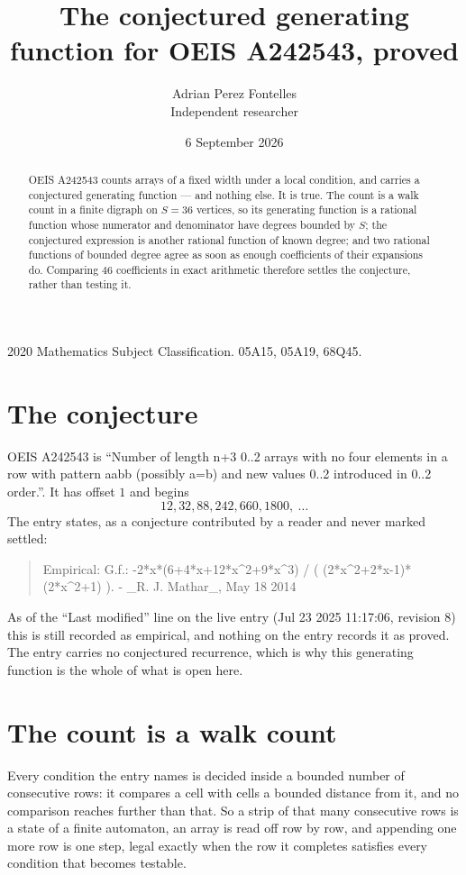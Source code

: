\documentclass[11pt,a4paper]{article}
\title{The conjectured generating function for OEIS A242543, proved}
\author{Adrian Perez Fontelles\\ \small Independent researcher}
\date{6 September 2026}
\theoremstyle{plain}
\theoremstyle{definition}
\begin{document}
\maketitle

\begin{abstract}
OEIS A242543 counts arrays of a fixed width under a local condition, and carries a conjectured
generating function --- and nothing else. It is true. The count is a walk count in a finite
digraph on $S=36$ vertices, so its generating function is a rational function whose numerator
and denominator have degrees bounded by $S$; the conjectured expression is another rational
function of known degree; and two rational functions of bounded degree agree as soon as enough
coefficients of their expansions do. Comparing $46$ coefficients in exact arithmetic
therefore settles the conjecture, rather than testing it.
\end{abstract}

\noindent\small 2020 Mathematics Subject Classification. 05A15, 05A19, 68Q45.\normalsize

\section{The conjecture}

OEIS A242543 is ``Number of length n+3 0..2 arrays with no four elements in a row with pattern aabb (possibly a=b) and new values 0..2 introduced in 0..2 order.''. It has offset $1$ and begins
\[
12, 32, 88, 242, 660, 1800,\ \dots
\]
The entry states, as a conjecture contributed by a reader and never marked settled:
\begin{quote}
Empirical: G.f.: -2*x*(6+4*x+12*x\^{}2+9*x\^{}3) / ( (2*x\^{}2+2*x-1)*(2*x\^{}2+1) ). - \_R. J. Mathar\_, May 18 2014
\end{quote}
As of the ``Last modified'' line on the live entry (Jul 23 2025 11:17:06, revision 8) this is still
recorded as empirical, and nothing on the entry records it as proved. The entry carries no
conjectured recurrence, which is why this generating function is the whole of what is open
here.

\section{The count is a walk count}

Every condition the entry names is decided inside a bounded number of consecutive rows: it
compares a cell with cells a bounded distance from it, and no comparison reaches further than
that. So a strip of that many consecutive rows is a state of a finite automaton, an array is
read off row by row, and appending one more row is one step, legal exactly when the row it
completes satisfies every condition that becomes testable.
\end{document}
